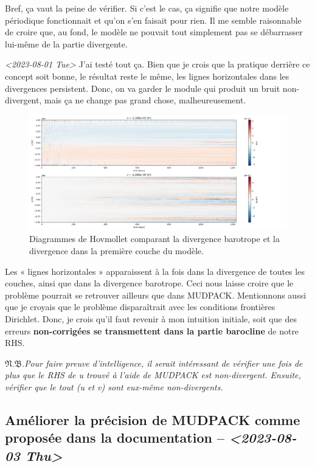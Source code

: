 \documentclass[10pt]{report}
\numberwithin{equation}{section}
\newcommand{\pt}{\hspace{1pt}} %
\newcommand{\nb}{\underline{{\footnotesize\EightStarConvex}\pt $\mathfrak{N.B.}$\vphantom{p}}\hspace{3pt}}
\begin{document}
Bref, ça vaut la peine de vérifier.
Si c'est le cas, ça signifie que notre modèle périodique fonctionnait et qu'on s'en faisait pour rien.
Il me semble raisonnable de croire que, au fond, le modèle ne pouvait tout simplement pas se débarrasser lui-même de la partie divergente.\bigskip

\textit{<2023-08-01 Tue> } J'ai testé tout ça.
Bien que je crois que la pratique derrière ce concept soit bonne, le résultat reste le même, les lignes horizontales dans les divergences persistent.
Donc, on va garder le module qui produit un bruit non-divergent, mais ça ne change pas grand chose, malheureusement.

\begin{figure}[htbp]
\centering
\includegraphics[width=.9\linewidth]{figures/debuggage/2023_08_03_comp_divergences.png}
\caption{Diagrammes de Hovmollet comparant la divergence barotrope et la divergence dans la première couche du modèle.}
\end{figure}

Les « lignes horizontales » apparaissent à la fois dans la divergence de toutes les couches, ainsi que dans la divergence barotrope.
Ceci nous laisse croire que le problème pourrait se retrouver ailleurs que dans MUDPACK.
Mentionnons aussi que je croyais que le problème disparaîtrait avec les conditions frontières Dirichlet.
Donc, je crois qu'il faut revenir à mon intuition initiale, soit que des erreurs \textbf{non-corrigées se transmettent dans la partie barocline} de notre RHS.\bigskip

\nb \emph{Pour faire preuve d'intelligence, il serait intéressant de vérifier une fois de plus que le RHS de u trouvé à l'aide de MUDPACK est non-divergent.
Ensuite, vérifier que le tout (u et v) sont eux-même non-divergents.}


\subsection{Améliorer la précision de MUDPACK comme proposée dans la documentation -- \textit{<2023-08-03 Thu>}}
\label{sec:org2c16a24}
\end{document}
